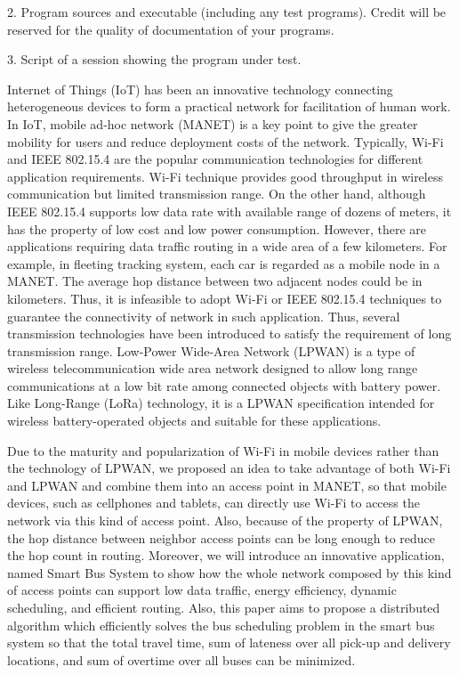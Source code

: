 \documentclass[runningheads]{llncs}
\begin{document}
2. Program sources and executable (including any test programs). Credit will be reserved for the quality of documentation of your programs.

3. Script of a session showing the program under test.

Internet of Things (IoT) has been an innovative technology connecting heterogeneous devices to form a practical network for facilitation of human work. In IoT, mobile ad‐hoc network (MANET) is a key point to give the greater mobility for users and reduce deployment costs of the network. Typically, Wi-Fi and IEEE 802.15.4 are the popular communication technologies for different application requirements. Wi-Fi technique provides good throughput in wireless communication but limited transmission range. On the other hand, although IEEE 802.15.4 supports low data rate with available range of dozens of meters, it has the property of low cost and low power consumption. However, there are applications requiring data traffic routing in a wide area of a few kilometers. For example, in fleeting tracking system, each car is regarded as a mobile node in a MANET. The average hop distance between two adjacent nodes could be in kilometers. Thus, it is infeasible to adopt Wi-Fi or IEEE 802.15.4 techniques to guarantee the connectivity of network in such application. Thus, several transmission technologies have been introduced to satisfy the requirement of long transmission range. Low-Power Wide-Area Network (LPWAN) is a type of wireless telecommunication wide area network designed to allow long range communications at a low bit rate among connected objects with battery power. Like Long-Range (LoRa) technology, it is a LPWAN specification intended for wireless battery-operated objects and suitable for these applications.

Due to the maturity and popularization of Wi-Fi in mobile devices rather than the technology of LPWAN, we proposed an idea to take advantage of both Wi-Fi and LPWAN and combine them into an access point in MANET, so that mobile devices, such as cellphones and tablets, can directly use Wi-Fi to access the network via this kind of access point. Also, because of the property of LPWAN, the hop distance between neighbor access points can be long enough to reduce the hop count in routing. Moreover, we will introduce an innovative application, named Smart Bus System to show how the whole network composed by this kind of access points can support low data traffic, energy efficiency, dynamic scheduling, and efficient routing. Also, this paper aims to propose a distributed algorithm which efficiently solves the bus scheduling problem in the smart bus system so that the total travel time, sum of lateness over all pick-up and delivery locations, and sum of overtime over all buses can be minimized.
\end{document}
